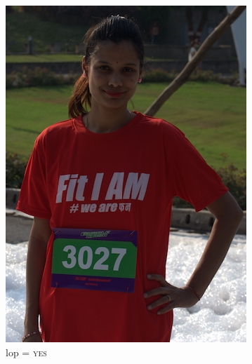 \begin{figure}[p]
  \centering
  \hspace{\fill}
  \begin{subfigure}[b]{0.25\textwidth}
    \includegraphics[width=\textwidth]{images/dataset/Prominence_LoP_Yes}
    \caption{\gls{lop} = \textsc{yes}}
  \end{subfigure}
  \hspace{\fill}
  \begin{subfigure}[b]{0.25\textwidth}

\end{subfigure}
\end{figure}
